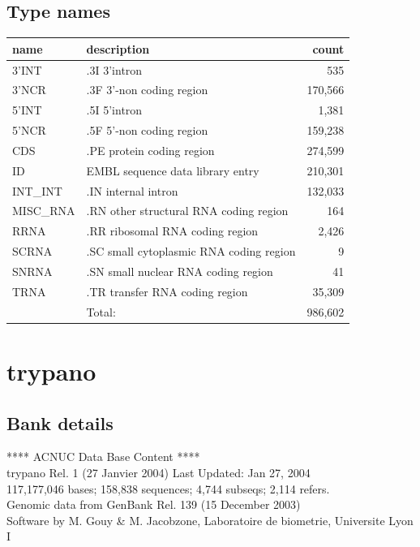 \documentclass{article}
\begin{document}
\begin{Schunk}
\subsection{Type names}
\noindent\begin{tabular}{llr}
\hline \hline
name & description & count \\
\hline
3'INT  &  .3I 3'intron  &  535 \\
3'NCR  &  .3F  3'-non coding region  &  170,566 \\
5'INT  &  .5I 5'intron  &  1,381 \\
5'NCR  &  .5F  5'-non coding region  &  159,238 \\
CDS  &  .PE protein coding region  &  274,599 \\
ID  &  EMBL sequence data library entry  &  210,301 \\
INT\_INT  &  .IN  internal intron  &  132,033 \\
MISC\_RNA  &  .RN other structural RNA coding region  &  164 \\
RRNA  &  .RR ribosomal RNA coding region  &  2,426 \\
SCRNA  &  .SC small cytoplasmic RNA coding region  &  9 \\
SNRNA  &  .SN small nuclear RNA coding region  &  41 \\
TRNA  &  .TR transfer RNA coding region  &  35,309 \\
\hline
 & Total: & 986,602 \\
\hline \hline
\end{tabular}

\section{ trypano }
\subsection{Bank details}
             ****     ACNUC Data Base Content      ****                         \\
         trypano Rel. 1 (27 Janvier 2004) Last Updated: Jan 27, 2004\\
117,177,046 bases; 158,838 sequences; 4,744 subseqs; 2,114 refers.\\
	Genomic data from GenBank Rel. 139 (15 December 2003)\\
Software by M. Gouy \& M. Jacobzone, Laboratoire de biometrie, Universite Lyon I 


\end{Schunk}
\end{document}
